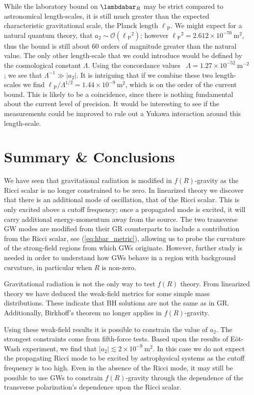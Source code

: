 \documentclass[aps,prd,amsfonts,amssymb,amsmath,nofootinbib,reprint,showpacs]{revtex4-1}
\newcommand{\eqnref}[1]{(\ref{eq:#1})}
\newcommand{\units}[1]{\ensuremath{~\mathrm{#1}}}
\newcommand{\sub}[1]{\ensuremath{_\text{#1}}}
\newcommand{\order}[1]{\ensuremath{\mathcal{O}({#1})}}
\begin{document}
While the laboratory bound on $\lambdabar_R$ may be strict compared to astronomical length-scales, it is still much greater than the expected characteristic gravitational scale, the Planck length $\ell\sub{P}$. We might expect for a natural quantum theory, that $a_2 \sim \order{\ell\sub{P}^2}$; however $\ell\sub{P}^2 = 2.612 \times 10^{-70}\units{m^2}$, thus the bound is still about $60$ orders of magnitude greater than the natural value. The only other length-scale that we could introduce would be defined by the cosmological constant $\Lambda$. Using the concordance values~\cite{Hinshaw2009} $\Lambda = 1.27 \times 10^{-52}\units{m^{-2}}$; we see that $\Lambda^{-1} \gg |a_2|$. It is intriguing that if we combine these two length-scales we find ${\ell\sub{P}}/{\Lambda^{1/2}} = 1.44 \times 10^{-9}\units{m^2}$, which is on the order of the current bound. This is likely to be a coincidence, since there is nothing fundamental about the current level of precision. It would be interesting to see if the measurements could be improved to rule out a Yukawa interaction around this length-scale.

\section{Summary \& Conclusions\label{sec:f_Discuss}}

We have seen that gravitational radiation is modified in $f(R)$-gravity as the Ricci scalar is no longer constrained to be zero. In linearized theory we discover that there is an additional mode of oscillation, that of the Ricci scalar. This is only excited above a cutoff frequency; once a propagated mode is excited, it will carry additional energy-momentum away from the source. The two transverse GW modes are modified from their GR counterparts to include a contribution from the Ricci scalar, see \eqnref{hbar_metric}, allowing us to probe the curvature of the strong-field regions from which GWs originate. However, further study is needed in order to understand how GWs behave in a region with background curvature, in particular when $R$ is non-zero.

Gravitational radiation is not the only way to test $f(R)$ theory. From linearized theory we have deduced the weak-field metrics for some simple mass distributions. These indicate that BH solutions are not the same as in GR. Additionally, Birkhoff's theorem no longer applies in $f(R)$-gravity.

Using these weak-field results it is possible to constrain the value of $a_2$. The strongest constraints come from fifth-force tests. Based upon the results of E\"ot-Wash experiment, we find that $|a_2| \lesssim 2 \times 10^{-9}\units{m^2}$. In this case we do not expect the propagating Ricci mode to be excited by astrophysical systems as the cutoff frequency is too high. Even in the absence of the Ricci mode, it may still be possible to use GWs to constrain $f(R)$-gravity through the dependence of the transverse polarization's dependence upon the Ricci scalar.
\end{document}
